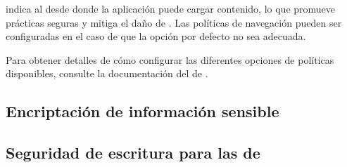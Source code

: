 \httpHeaderCSPINT  indica al \browserINT desde donde la aplicación puede cargar contenido, lo que promueve prácticas seguras y mitiga el daño de \crossSiteScriptingINT \cite{online_html5rocks_CSP_introduction}. Las políticas de navegación pueden ser configuradas en el caso de que la opción por defecto no sea adecuada.

Para obtener detalles de cómo configurar las diferentes opciones de políticas disponibles, consulte la documentación del \packageAS  de \meteorNAME \browserPolicyPackage.


\subsection{Encriptación de información sensible}



\subsection{Seguridad de escritura para las \collectionsname de \mongodbNAME}







